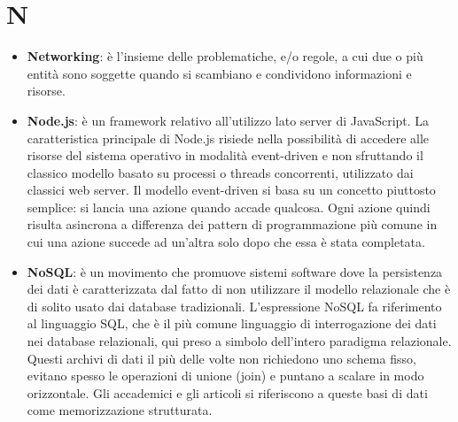 	\section{N}
\begin{itemize}
	\item
	\textbf{Networking}: è l’insieme delle problematiche, e/o regole, a cui due o più entità sono soggette quando si scambiano e condividono informazioni e risorse.  
	\item
	\textbf{Node.js}: è un framework relativo all'utilizzo lato server di JavaScript.
	 La caratteristica principale di Node.js risiede nella possibilità di accedere alle risorse del sistema operativo in modalità event-driven e non sfruttando il classico modello basato su processi o threads concorrenti, utilizzato dai classici web server. Il modello event-driven si basa su un concetto piuttosto semplice: si lancia una azione quando accade qualcosa. Ogni azione quindi risulta asincrona a differenza dei pattern di programmazione più comune in cui una azione succede ad un'altra solo dopo che essa è stata completata.
	 \item
	 \textbf{NoSQL}: è un movimento che promuove sistemi software dove la persistenza dei dati è caratterizzata dal fatto di non utilizzare il modello relazionale che è di solito usato dai database tradizionali. L'espressione NoSQL fa riferimento al linguaggio SQL, che è il più comune linguaggio di interrogazione dei dati nei database relazionali, qui preso a simbolo dell'intero paradigma relazionale.
	 Questi archivi di dati il più delle volte non richiedono uno schema fisso, evitano spesso le operazioni di unione (join) e puntano a scalare in modo orizzontale. Gli accademici e gli articoli si riferiscono a queste basi di dati come memorizzazione strutturata.
\end{itemize}